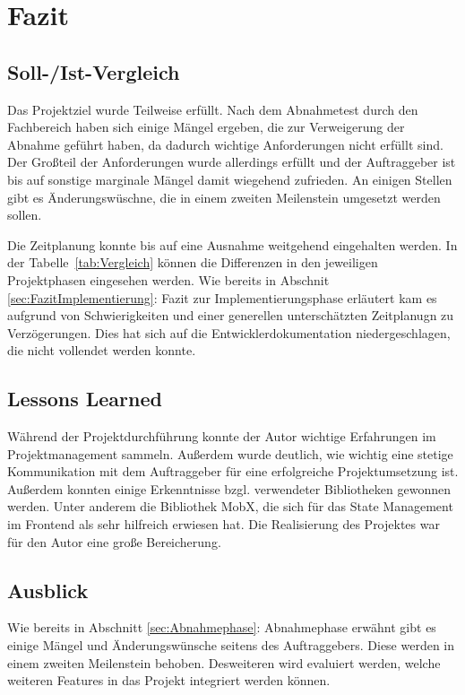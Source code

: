 \section{Fazit} 
\label{sec:Fazit}

\subsection{Soll-/Ist-Vergleich}
\label{sec:SollIstVergleich}

Das Projektziel wurde Teilweise erfüllt. Nach dem Abnahmetest durch den Fachbereich haben sich einige Mängel ergeben, die zur Verweigerung der Abnahme geführt haben, da dadurch wichtige Anforderungen nicht erfüllt sind. Der Großteil der Anforderungen wurde allerdings erfüllt und der Auftraggeber ist bis auf sonstige marginale Mängel damit wiegehend zufrieden. An einigen Stellen gibt es Änderungswüschne, die in einem zweiten Meilenstein umgesetzt werden sollen.

Die Zeitplanung konnte bis auf eine Ausnahme weitgehend eingehalten werden. In der Tabelle~\ref{tab:Vergleich} können die Differenzen in den jeweiligen Projektphasen eingesehen werden. Wie bereits in Abschnit \ref{sec:FazitImplementierung}: Fazit zur Implementierungsphase erläutert kam es aufgrund von Schwierigkeiten und einer generellen unterschätzten Zeitplanugn zu Verzögerungen. Dies hat sich auf die Entwicklerdokumentation niedergeschlagen, die nicht vollendet werden konnte.



\subsection{Lessons Learned}
\label{sec:LessonsLearned}

Während der Projektdurchführung konnte der Autor wichtige Erfahrungen im Projektmanagement sammeln. Außerdem wurde deutlich, wie wichtig eine stetige Kommunikation mit dem Auftraggeber für eine erfolgreiche Projektumsetzung ist. Außerdem konnten einige Erkenntnisse bzgl. verwendeter Bibliotheken gewonnen werden. Unter anderem die Bibliothek MobX, die sich für das State Management im Frontend als sehr hilfreich erwiesen hat. Die Realisierung des Projektes war für den Autor eine große Bereicherung.


\subsection{Ausblick}
\label{sec:Ausblick}

Wie bereits in Abschnitt \ref{sec:Abnahmephase}: Abnahmephase erwähnt gibt es einige Mängel und Änderungswünsche seitens des Auftraggebers. Diese werden in einem zweiten Meilenstein behoben. Desweiteren wird evaluiert werden, welche weiteren Features in das Projekt integriert werden können.